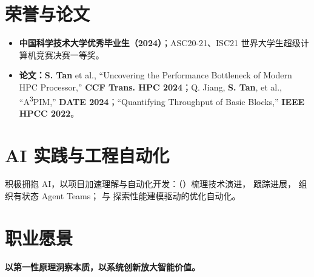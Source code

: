 \documentclass{resume}
\begin{document}
\section{荣誉与论文}
\begin{itemize}
  \item \textbf{中国科学技术大学优秀毕业生（2024）}；ASC20-21、ISC21 世界大学生超级计算机竞赛决赛一等奖。
  \small
  \item \textbf{论文：S. Tan} et al., ``Uncovering the Performance Bottleneck of Modern HPC Processor,'' \textbf{CCF Trans. HPC 2024}；Q. Jiang, \textbf{S. Tan}, et al., ``A\textsuperscript{3}PIM,'' \textbf{DATE 2024}；``Quantifying Throughput of Basic Blocks,'' \textbf{IEEE HPCC 2022}。
\end{itemize}

\section{AI 实践与工程自动化}
\noindent 积极拥抱 AI，以项目加速理解与自动化开发：（）梳理技术演进， 跟踪进展， 组织有状态 Agent Teams； 与  探索性能建模驱动的优化自动化。

\section{职业愿景}
\noindent\textbf{以第一性原理洞察本质，以系统创新放大智能价值。}
\end{document}
